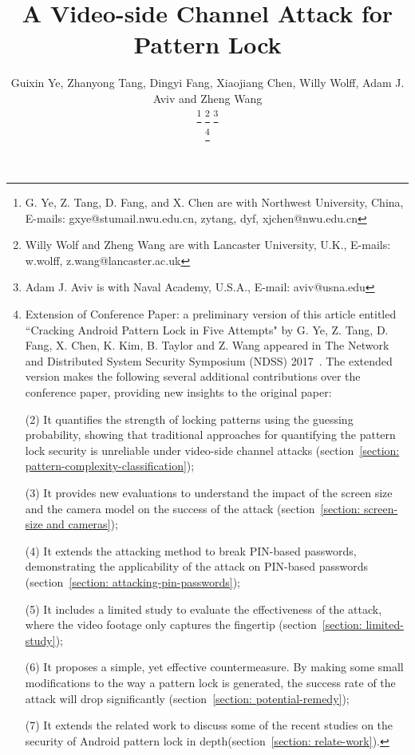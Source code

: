 \documentclass[journal,table,twoside]{IEEEtran}
\begin{document}
\title{A Video-side Channel Attack for Pattern Lock}
\author{Guixin Ye, Zhanyong Tang, Dingyi Fang, Xiaojiang Chen,
        Willy Wolff, Adam J. Aviv and Zheng Wang

    \thanks{G. Ye, Z. Tang, D. Fang, and X. Chen are with Northwest University, China, E-mails: gxye@stumail.nwu.edu.cn, {zytang, dyf, xjchen}@nwu.edu.cn }%
    \thanks{Willy Wolf and Zheng Wang are with Lancaster University, U.K., E-mails: {w.wolff, z.wang}@lancaster.ac.uk}%
    \thanks{Adam J. Aviv is with Naval Academy, U.S.A., E-mail: aviv@usna.edu}

    \thanks{
            Extension of Conference Paper: a preliminary version of this article entitled ``Cracking Android Pattern Lock
            in Five Attempts" by G. Ye, Z. Tang, D. Fang, X. Chen, K. Kim, B. Taylor and Z. Wang appeared in
            The Network and Distributed System Security Symposium (NDSS) 2017~\cite{ye2017cracking}.
            The extended version makes the following several additional contributions over the conference
            paper, providing new insights to the original paper:


            (2)	It quantifies the strength of locking patterns using the guessing probability, showing that traditional approaches for quantifying the pattern lock security is unreliable under video-side channel attacks (section~\ref{section: pattern-complexity-classification});


            (3)	It provides new evaluations to understand the impact of the screen size and the camera model on the success of the attack (section~\ref{section: screen-size and cameras});

            (4)	It extends the attacking method to break PIN-based passwords, demonstrating the applicability of the attack on PIN-based passwords (section~\ref{section: attacking-pin-passwords});

            (5)	It includes a limited study to evaluate the effectiveness of the attack, where the video footage only captures the fingertip (section~\ref{section: limited-study});


            (6)	It proposes a simple, yet effective countermeasure. By making some small modifications to the way a pattern lock is generated, the success rate of the attack will drop significantly (section~\ref{section: potential-remedy});


            (7)	It extends the related work to discuss some of the recent studies on the security of Android pattern lock in depth(section~\ref{section: relate-work}).

    }
}
\end{document}

